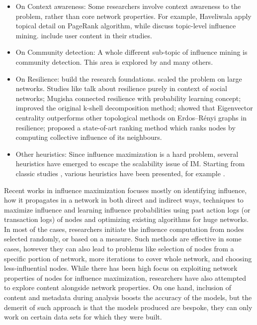 \begin{itemize}
		\item On Context awareness: Some researchers involve context awareness to the problem, rather than core network properties. For example, Haveliwala \cite{haveliwala2002} apply topical detail on PageRank algorithm, while \cite{liu2010,weng2010,li2012} discuss topic-level influence mining. \cite{carnes2007,bakshy2009,bohn2011,barbieri2014} include user content in their studies.
		
		\item On Community detection: A whole different sub-topic of influence mining is community detection. This area is explored by \cite{goyal2008,goyal2009,leskovec2012,mehmood2013,sallaberry2013} and many others.
		
		\item On Resilience: \cite{seidman1983,pagerank1999} build the research foundations. \cite{carmi2007,kitsak2010} scaled the problem on large networks. Studies like \cite{goyal2008,borge2012} talk about resilience purely in context of social networks; Mugisha \cite{mugisha2016} connected resilience with probability learning concept; \cite{zdeborova2016} improved the original k-shell decomposition method; \cite{braunstein2016} showed that Eigenvector centrality outperforms other topological methods on Erdos–Rényi graphs in resilience; \cite{morone2015} proposed a state-of-art ranking method which ranks nodes by computing collective influence of its neighbours.
		
		\item Other heuristics: Since influence maximization is a hard problem, several heuristics have emerged to escape the scalability issue of IM. Starting from classic studies \cite{freeman1979,valente1995}, various heuristics have been presented, for example \cite{kempe2005,kitsak2010,chen2011,aral2011,borgs2014,morone2015,tang2015}.
	\end{itemize}

Recent works in influence maximization focuses mostly on identifying influence, how it propagates in a network in both direct and indirect ways, techniques to maximize influence and learning influence probabilities using past action logs (or transaction logs) of nodes and optimizing existing algorithms for huge networks. In most of the cases, researchers initiate the influence computation from nodes selected randomly, or based on a measure. Such methods are effective in some cases, however they can also lead to problems like selection of nodes from a specific portion of network, more iterations to cover whole network, and choosing less-influential nodes. While there has been high focus on exploiting network properties of nodes for influence maximization, researchers have also attempted to explore content alongside network properties. On one hand, inclusion of content and metadata during analysis boosts the accuracy of the models, but the demerit of such approach is that the models produced are bespoke, they can only work on certain data sets for which they were built.

